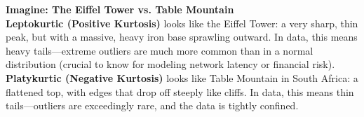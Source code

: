 \documentclass[12pt]{article}
\begin{document}
\vspace{0.2cm}
\begin{center}
\end{center}

\vspace{0.5em}
\noindent\textbf{Imagine: The Eiffel Tower vs. Table Mountain}\\
\textbf{Leptokurtic (Positive Kurtosis)} looks like the Eiffel Tower: a very sharp, thin peak, but with a massive, heavy iron base sprawling outward. In data, this means heavy tails—extreme outliers are much more common than in a normal distribution (crucial to know for modeling network latency or financial risk). \\
\textbf{Platykurtic (Negative Kurtosis)} looks like Table Mountain in South Africa: a flattened top, with edges that drop off steeply like cliffs. In data, this means thin tails—outliers are exceedingly rare, and the data is tightly confined.
\end{document}
